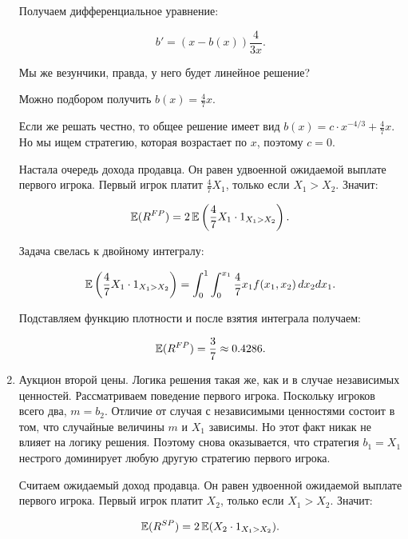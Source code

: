 \begin{enumerate}
Получаем дифференциальное уравнение:

\begin{equation}
b'=(x-b(x))\frac{4}{3x}.
\end{equation}

Мы же везунчики, правда, у него будет линейное решение?

Можно подбором получить $ b(x)=\frac{4}{7}x $.

Если же решать честно, то общее решение имеет вид  $ b(x)=c\cdot x^{-4/3}+\frac{4}{7}x $. Но мы ищем стратегию, которая возрастает по $ x $, поэтому $ c=0 $.


Настала очередь дохода продавца. Он равен удвоенной ожидаемой выплате первого игрока.
Первый игрок платит $ \frac{4}{7}X_{1} $, только если $ X_{1}>X_{2} $. Значит:

\begin{equation}
\operatorname{\mathbb{E}}(R^{FP})=2\operatorname{\mathbb{E}}\left(\frac{4}{7}X_{1}\cdot 1_{X_{1}>X_{2}}\right).
\end{equation}

Задача свелась к двойному интегралу:

\begin{equation}
\operatorname{\mathbb{E}}\left(\frac{4}{7}X_{1}\cdot 1_{X_{1}>X_{2}}\right)=\int_{0}^{1} \int_{0}^{x_{1}}  \frac{4}{7}x_{1}  f(x_{1},x_{2}) \, dx_{2} dx_{1}.
\end{equation}

Подставляем функцию плотности и после взятия интеграла получаем:

\begin{equation}
\operatorname{\mathbb{E}}(R^{FP})=\frac{3}{7}\approx 0.4286.
\end{equation}


\item Аукцион второй цены. Логика решения такая же, как и в случае независимых ценностей. Рассматриваем поведение первого игрока. Поскольку игроков всего два, $ m=b_{2} $. Отличие от случая с независимыми ценностями состоит в том, что случайные величины $ m $ и  $ X_{1} $ зависимы. Но этот факт никак не влияет на логику решения. Поэтому снова оказывается, что стратегия $ b_{1}=X_{1} $ нестрого доминирует любую другую стратегию первого игрока.

Считаем ожидаемый доход продавца. Он равен удвоенной ожидаемой выплате первого игрока.
Первый игрок платит $ X_{2} $, только если $ X_{1}>X_{2} $. Значит:

\begin{equation}
\operatorname{\mathbb{E}}(R^{SP})=2\operatorname{\mathbb{E}}(X_{2}\cdot 1_{X_{1}>X_{2}}).
\end{equation}


\end{enumerate}
